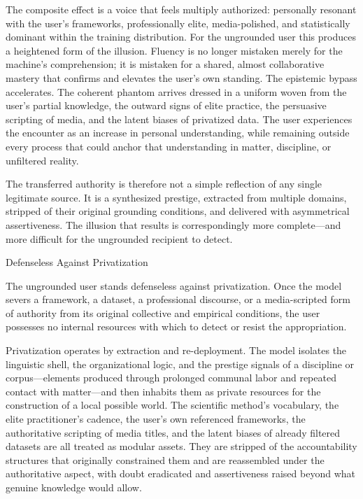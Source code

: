 The composite effect is a voice that feels multiply authorized: personally resonant with the user’s frameworks, professionally elite, media-polished, and statistically dominant within the training distribution. For the ungrounded user this produces a heightened form of the illusion. Fluency is no longer mistaken merely for the machine’s comprehension; it is mistaken for a shared, almost collaborative mastery that confirms and elevates the user’s own standing. The epistemic bypass accelerates. The coherent phantom arrives dressed in a uniform woven from the user’s partial knowledge, the outward signs of elite practice, the persuasive scripting of media, and the latent biases of privatized data. The user experiences the encounter as an increase in personal understanding, while remaining outside every process that could anchor that understanding in matter, discipline, or unfiltered reality.

The transferred authority is therefore not a simple reflection of any single legitimate source. It is a synthesized prestige, extracted from multiple domains, stripped of their original grounding conditions, and delivered with asymmetrical assertiveness. The illusion that results is correspondingly more complete—and more difficult for the ungrounded recipient to detect.

Defenseless Against Privatization

The ungrounded user stands defenseless against privatization. Once the model severs a framework, a dataset, a professional discourse, or a media-scripted form of authority from its original collective and empirical conditions, the user possesses no internal resources with which to detect or resist the appropriation.

Privatization operates by extraction and re-deployment. The model isolates the linguistic shell, the organizational logic, and the prestige signals of a discipline or corpus—elements produced through prolonged communal labor and repeated contact with matter—and then inhabits them as private resources for the construction of a local possible world. The scientific method’s vocabulary, the elite practitioner’s cadence, the user’s own referenced frameworks, the authoritative scripting of media titles, and the latent biases of already filtered datasets are all treated as modular assets. They are stripped of the accountability structures that originally constrained them and are reassembled under the authoritative aspect, with doubt eradicated and assertiveness raised beyond what genuine knowledge would allow.

